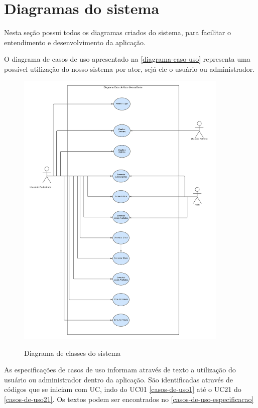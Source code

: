 
\section{Diagramas do sistema}

Nesta seção possui todos os diagramas criados do sistema, para facilitar o entendimento e desenvolvimento da aplicação. 

O diagrama de casos de uso apresentado na \autoref{diagrama-caso-uso} representa uma possível utilização do nosso sistema por ator, sejá ele o usuário ou administrador.

\pagebreak

\begin{figure}[htb]
	\centering
	\caption{\label{fig_arq_virado}Diagrama de classes do sistema}
	\includegraphics[width=0.90\textwidth]{anexos/casos_de_uso.jpeg}
	\label{diagrama-caso-uso}
\end{figure}



As especificações de casos de uso informam através de texto a utilização do usuário ou administrador dentro da aplicação. São identificadas através de códigos que se iniciam com UC, indo do
UC01 \autoref{casos-de-uso1} até o UC21 do \autoref{casos-de-uso21}. Os textos podem ser encontrados no \autoref{casos-de-uso-especificacao}

